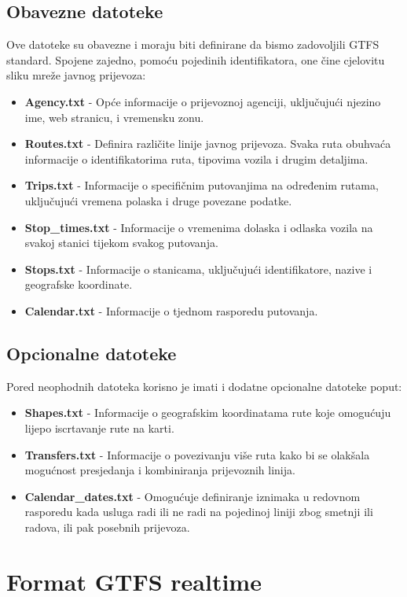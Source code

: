 \documentclass[zavrsnirad]{fer}
\begin{document}
\newpage

\subsection{Obavezne datoteke}
Ove datoteke su obavezne i moraju biti definirane da bismo zadovoljili GTFS standard. Spojene zajedno, pomoću pojedinih identifikatora, one čine cjelovitu sliku mreže javnog prijevoza:
\begin{itemize}
	\item \textbf{Agency.txt} -
	Opće informacije o prijevoznoj agenciji, uključujući njezino ime, web stranicu, i vremensku zonu.
	\item \textbf{Routes.txt} -
	Definira različite linije javnog prijevoza. Svaka ruta obuhvaća informacije o identifikatorima ruta, tipovima vozila i drugim detaljima.
	\item \textbf{Trips.txt} -
	Informacije o specifičnim putovanjima na određenim rutama, uključujući vremena polaska i druge povezane podatke.
	\item \textbf{Stop\_times.txt} -
	Informacije o vremenima dolaska i odlaska vozila na svakoj stanici tijekom svakog putovanja.
	\item \textbf{Stops.txt} -
	Informacije o stanicama, uključujući identifikatore, nazive i geografske koordinate.
	\item \textbf{Calendar.txt} -
	Informacije o tjednom rasporedu putovanja.
\end{itemize}

\subsection{Opcionalne datoteke}
Pored neophodnih datoteka korisno je imati i dodatne opcionalne datoteke poput:
\begin{itemize}
	\item \textbf{Shapes.txt} -
	Informacije o geografskim koordinatama rute koje omogućuju lijepo iscrtavanje rute na karti.
	\item \textbf{Transfers.txt} -
	Informacije o povezivanju više ruta kako bi se olakšala mogućnost presjedanja i kombiniranja prijevoznih linija.
	\item \textbf{Calendar\_dates.txt} -
	Omogućuje definiranje iznimaka u redovnom rasporedu kada usluga radi ili ne radi na pojedinoj liniji zbog smetnji ili radova, ili pak posebnih prijevoza.
\end{itemize}

\section{Format GTFS realtime}
\end{document}
